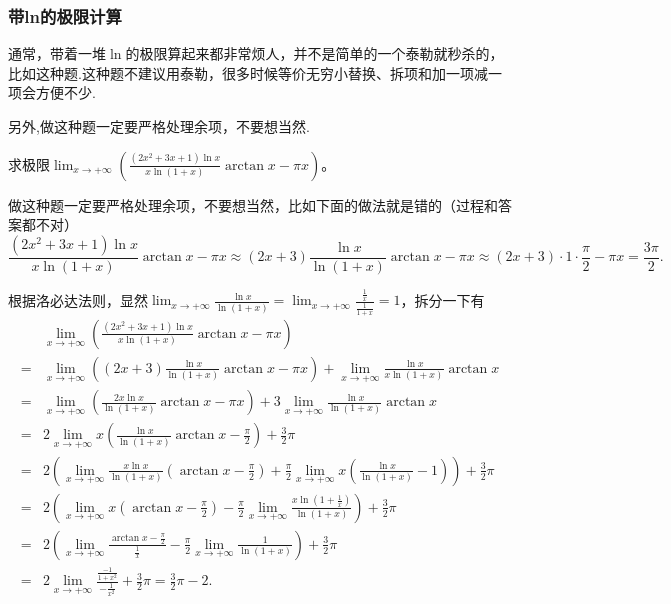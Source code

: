 \documentclass[lang=cn,newtx,10pt,scheme=chinese]{elegantbook}
\begin{document}
\subsubsection{带ln的极限计算}
通常，带着一堆\(\ln\)的极限算起来都非常烦人，并不是简单的一个泰勒就秒杀的，比如这种题.这种题不建议用泰勒，很多时候等价无穷小替换、拆项和加一项减一项会方便不少.

\begin{remark}
   另外,做这种题一定要严格处理余项，不要想当然.
\end{remark}
\begin{example}
求极限\(\lim_{x\rightarrow +\infty}\left(\frac{(2x^2 + 3x + 1)\ln x}{x\ln(1 + x)}\arctan x-\pi x\right)\)。
\end{example}
\begin{remark}
   做这种题一定要严格处理余项，不要想当然，比如下面的做法就是错的（过程和答案都不对）
\[\frac{(2x^2 + 3x + 1)\ln x}{x\ln(1 + x)}\arctan x-\pi x\approx(2x + 3)\frac{\ln x}{\ln(1 + x)}\arctan x-\pi x\approx(2x + 3)\cdot1\cdot\frac{\pi}{2}-\pi x=\frac{3\pi}{2}.\]
\end{remark}
\begin{solution}
   根据洛必达法则，显然\(\lim_{x\rightarrow +\infty}\frac{\ln x}{\ln(1 + x)}=\lim_{x\rightarrow +\infty}\frac{\frac{1}{x}}{\frac{1}{1 + x}} = 1\)，拆分一下有
\begin{align*}
&\lim_{x\rightarrow +\infty}\left(\frac{(2x^2 + 3x + 1)\ln x}{x\ln(1 + x)}\arctan x-\pi x\right)\\
=&\lim_{x\rightarrow +\infty}\left((2x + 3)\frac{\ln x}{\ln(1 + x)}\arctan x-\pi x\right)+\lim_{x\rightarrow +\infty}\frac{\ln x}{x\ln(1 + x)}\arctan x\\
=&\lim_{x\rightarrow +\infty}\left(\frac{2x\ln x}{\ln(1 + x)}\arctan x-\pi x\right)+3\lim_{x\rightarrow +\infty}\frac{\ln x}{\ln(1 + x)}\arctan x\\
=&2\lim_{x\rightarrow +\infty}x\left(\frac{\ln x}{\ln(1 + x)}\arctan x-\frac{\pi}{2}\right)+\frac{3}{2}\pi\\
=&2\left(\lim_{x\rightarrow +\infty}\frac{x\ln x}{\ln(1 + x)}\left(\arctan x-\frac{\pi}{2}\right)+\frac{\pi}{2}\lim_{x\rightarrow +\infty}x\left(\frac{\ln x}{\ln(1 + x)}-1\right)\right)+\frac{3}{2}\pi\\
=&2\left(\lim_{x\rightarrow +\infty}x\left(\arctan x-\frac{\pi}{2}\right)-\frac{\pi}{2}\lim_{x\rightarrow +\infty}\frac{x\ln(1 + \frac{1}{x})}{\ln(1 + x)}\right)+\frac{3}{2}\pi\\
=&2\left(\lim_{x\rightarrow +\infty}\frac{\arctan x-\frac{\pi}{2}}{\frac{1}{x}}-\frac{\pi}{2}\lim_{x\rightarrow +\infty}\frac{1}{\ln(1 + x)}\right)+\frac{3}{2}\pi\\
=&2\lim_{x\rightarrow +\infty}\frac{\frac{-1}{1 + x^2}}{-\frac{1}{x^2}}+\frac{3}{2}\pi=\frac{3}{2}\pi - 2.
\end{align*}
\end{solution}
\end{document}
